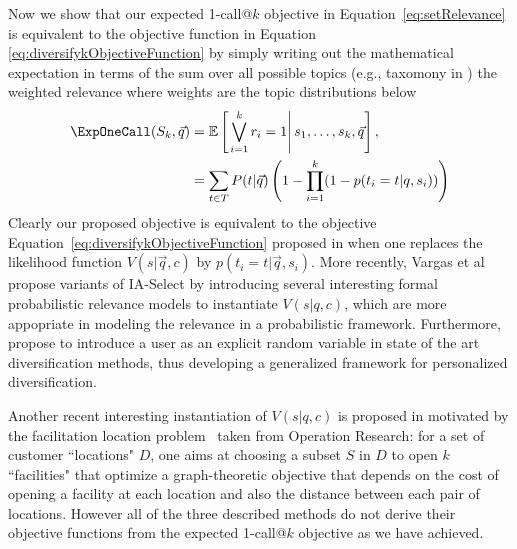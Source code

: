 Now we show that our expected 1-call@$k$ objective in Equation~\eqref{eq:setRelevance} is equivalent to the objective function in Equation \eqref{eq:diversifykObjectiveFunction} by simply writing out the mathematical expectation in terms of the sum over all possible topics (e.g., taxomony in \cite{agrawal09diversifying}) the weighted relevance where weights are the topic distributions below
\begin{align*}
    \ExpOneCall(S_k,\vec{q}) & = \mathbb{E} \left[\left. \bigvee_{i=1}^{k}r_i=1 \right| s_{1},\dots, s_{k},\vec{q} \right], \\
    												 & = \sum_{t\in T} P(t|\vec{q}) \left( 1 - \prod_{i=1}^{k}(1-p(t_i = t| q, s_i))\right) 
\end{align*}
Clearly our proposed objective is equivalent to the objective Equation~\eqref{eq:diversifykObjectiveFunction} proposed in \cite{agrawal09diversifying} when one replaces the likelihood function $V(s|\vec{q}, c)$ by $p(t_i = t| \vec{q}, s_i)$. More recently, Vargas et al~\cite{Vargas:SIGIR2012} propose variants of IA-Select by introducing several interesting formal probabilistic relevance models to instantiate $V(s| q, c)$, which are more appopriate in modeling the relevance in a probabilistic framework. Furthermore, \cite{Vallet:SIGIR2012} propose to introduce a user as an explicit random variable in state of the art diversification methods, thus developing a generalized framework for personalized diversification.

Another recent interesting instantiation of $V(s|q,c)$ is proposed in \cite{Zuccon:ECIR2012} motivated by the facilitation location problem~\cite{Gonzalez:Handbook2007} taken from Operation Research: for a set of customer ``locations" $D$, one aims at choosing a subset $S$ in $D$ to open $k$ ``facilities" that optimize a graph-theoretic objective that depends on the cost of opening a facility at each location and also the distance between each pair of locations. However all of the three described methods do not derive their objective functions from the expected 1-call@$k$ objective as we have achieved. 

